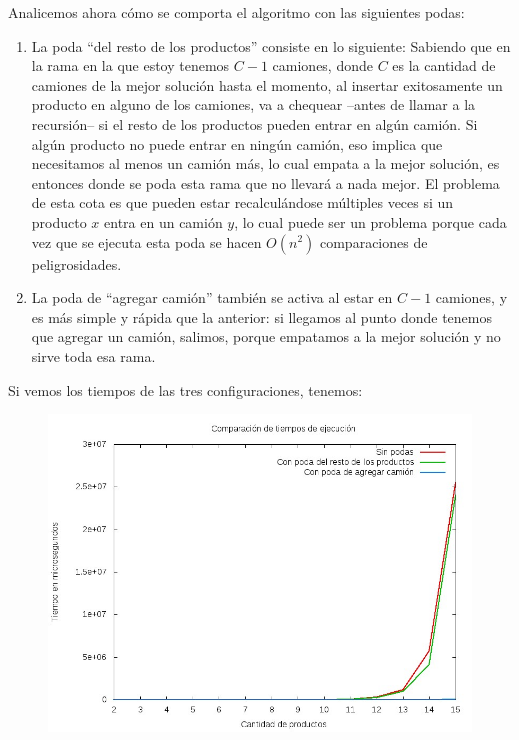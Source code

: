Analicemos ahora cómo se comporta el algoritmo con las siguientes podas: 
\begin{enumerate}
\item La poda ``del resto de los productos'' consiste en lo siguiente: Sabiendo que en la rama en la que estoy tenemos $C-1$ camiones, donde $C$ es la cantidad de camiones de la mejor solución hasta el momento, al insertar exitosamente un producto en alguno de los camiones, va a chequear --antes de llamar a la recursión-- si el resto de los productos pueden entrar en algún camión. Si algún producto no puede entrar en ningún camión, eso implica que necesitamos al menos un camión más, lo cual empata a la mejor solución, es entonces donde se poda esta rama que no llevará a nada mejor. El problema de esta cota es que pueden estar recalculándose múltiples veces si un producto $x$ entra en un camión $y$, lo cual puede ser un problema porque cada vez que se ejecuta esta poda se hacen $O(n^2)$ comparaciones de peligrosidades.
\item La poda de ``agregar camión'' también se activa al estar en $C-1$ camiones, y es más simple y rápida que la anterior: si llegamos al punto donde tenemos que agregar un camión, salimos, porque empatamos a la mejor solución y no sirve toda esa rama.
\end{enumerate}

Si vemos los tiempos de las tres configuraciones, tenemos:
\begin{figure}[H]
	\begin{minipage}[t]{\linewidth}
		\centering
		\includegraphics[width=\textwidth]{comparacion_tiempos_podas.jpg}
		\label{fig:p3_comparacion_3_configuraciones}
	\end{minipage}
\end{figure}

